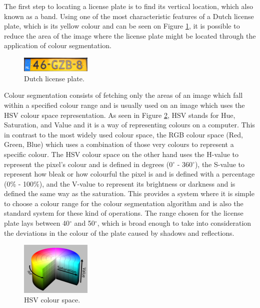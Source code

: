 
The first step to locating a license plate is to find its vertical location, which also known as a band. Using one of the most characteristic features of a Dutch license plate, which is its yellow colour and can be seen on Figure \ref{fig:dutch-plate}, it is possible to reduce the area of the image where the license plate might be located through the application of colour segmentation. 

\begin{figure}[ht]
    \centering
    \includegraphics[width=0.3\textwidth]{plaatjes/dutch-plate}
    \caption{Dutch license plate. \cite{dutch-license-fig}}
    \label{fig:dutch-plate}
\end{figure}

Colour segmentation consists of fetching only the areas of an image which fall within a specified colour range and is usually used on an image which uses the HSV colour space representation. As seen in Figure \ref{fig:hsv}, HSV stands for Hue, Saturation, and Value and it is a way of representing colours on a computer. This in contrast to the most widely used colour space, the RGB colour space (Red, Green, Blue) which uses a combination of those very colours to represent a specific colour. The HSV colour space on the other hand uses the H-value to represent the pixel's colour and is defined in degrees (0$^{\circ}$ - 360$^{\circ}$), the S-value to represent how bleak or how colourful the pixel is and is defined with a percentage (0\% - 100\%), and the V-value to represent its brightness or darkness and is defined the same way as the saturation. This provides a system where it is simple to choose a colour range for the colour segmentation algorithm and is also the standard system for these kind of operations. The range chosen for the license plate lays between 40$^{\circ}$ and 50$^{\circ}$, which is broad enough to take into consideration the deviations in the colour of the plate caused by shadows and reflections.

\begin{figure}[ht]
    \centering
    \includegraphics[width=0.3\textwidth]{plaatjes/hsv}
    \caption{HSV colour space. \cite{hsv-fig}}
    \label{fig:hsv}
\end{figure}

